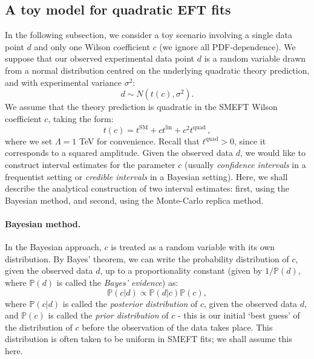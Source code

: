 \documentclass[withindex,glossary]{cam-thesis}
\begin{document}
\subsection{A toy model for quadratic EFT fits}
In the following subsection, we consider a toy scenario involving a single data point $d$ and only one
Wilson coefficient $c$ (we ignore all PDF-dependence).
%
We suppose that our observed experimental data point $d$ is a random variable drawn from a normal distribution
centred on the underlying quadratic theory prediction, and with experimental variance $\sigma^2$:
\begin{equation}
\label{eq:data_gaussian}
d \sim N(t(c), \sigma^2).
\end{equation}
We assume that the theory prediction is quadratic in the SMEFT Wilson coefficient $c$, taking the form:
\begin{equation}
t(c) = t^{\text{SM}} + c t^{\text{lin}} + c^2 t^{\text{quad}} \, ,
\end{equation}
where we set $\Lambda=1$ TeV for convenience. Recall that $t^{\text{quad}} > 0$, since it corresponds
to a squared amplitude.
%
Given the observed data $d$, we would like to construct interval estimates for the parameter
$c$ (usually \textit{confidence intervals} in a frequentist setting or \textit{credible intervals} in a Bayesian setting).
%
Here, we shall describe the analytical construction of two interval estimates: first, using the Bayesian method, and second, using the
Monte-Carlo replica method.

\paragraph{Bayesian method.}
In the Bayesian approach, $c$ is treated as a random variable with its own distribution. By Bayes'
theorem, we can write the probability distribution of $c$, given the observed data $d$, up to a proportionality constant (given by $1/\mathbb{P}(d)$, where $\mathbb{P}(d)$ is called the \textit{Bayes' evidence}) as:
\begin{equation}
\mathbb{P}(c | d) \propto \mathbb{P}(d | c) \mathbb{P}(c),
\end{equation}
\noindent
where $\mathbb{P}(c|d)$ is called the \textit{posterior distribution} of $c$, given the observed data $d$,
and  $\mathbb{P}(c)$ is called the \textit{prior distribution} of $c$ - this is our initial `best guess' of the distribution of $c$ before the observation
of the data takes place.
%
This distribution 
is often taken to be uniform in SMEFT fits; we shall assume this here.
\end{document}
